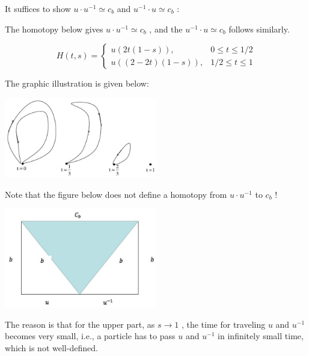 It suffices to show \(u \cdot  {u}^{-1} \simeq  {c}_{b}\) and \({u}^{-1} \cdot  u \simeq  {c}_{b}\) :

The homotopy below gives \(u \cdot  {u}^{-1} \simeq  {c}_{b}\) , and the \({u}^{-1} \cdot  u \simeq  {c}_{b}\) follows similarly.

\[
H\left( {t,s}\right)  = \left\{  \begin{array}{rr} u\left( {{2t}\left( {1 - s}\right) }\right) , & 0 \leq  t \leq  1/2 \\  u\left( {\left( {2 - {2t}}\right) \left( {1 - s}\right) }\right) , & 1/2 \leq  t \leq  1 \end{array}\right.
\]

The graphic illustration is given below:

\begin{center}
\includegraphics[max width=0.5\textwidth]{images/bo_d2bcsrref24c73avs720_117_636_1629_668_351_0.jpg}
\end{center}
\hspace*{3em} 

Note that the figure below does not define a homotopy from \(u \cdot  {u}^{-1}\) to \({c}_{b}\) !

\begin{center}
\includegraphics[max width=0.5\textwidth]{images/bo_d2bcsrref24c73avs720_118_529_423_599_389_0.jpg}
\end{center}
\hspace*{3em} 

The reason is that for the upper part, as \(s \rightarrow  1\) , the time for traveling \(u\) and \({u}^{-1}\) becomes very small, i.e., a particle has to pass \(u\) and \({u}^{-1}\) in infinitely small time, which is not well-defined.

